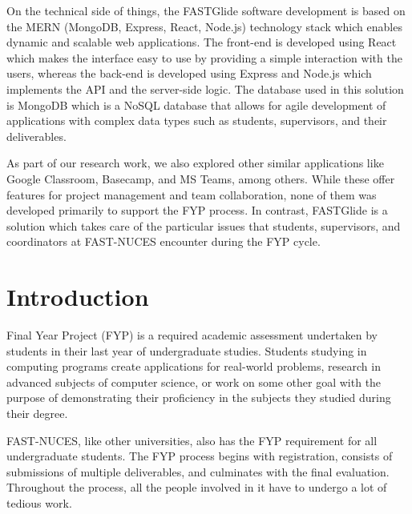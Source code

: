 \documentclass{FastFyp}
\begin{document}
On the technical side of things, the FASTGlide software development is based on the MERN (MongoDB, Express, React, Node.js) technology stack which enables dynamic and scalable web applications. The front-end is developed using React which makes the interface easy to use by providing a simple interaction with the users, whereas the back-end is developed using Express and Node.js which implements the API and the server-side logic. The database used in this solution is MongoDB which is a NoSQL database that allows for agile development of applications with complex data types such as students, supervisors, and their deliverables.

As part of our research work, we also explored other similar applications like Google Classroom, Basecamp, and MS Teams, among others. While these offer features for project management and team collaboration, none of them was developed primarily to support the FYP process. In contrast, FASTGlide is a solution which takes care of the particular issues that students, supervisors, and coordinators at FAST-NUCES encounter during the FYP cycle.
\pagebreak


\pagestyle{fancy} %
\tableofcontents

\pagebreak
\listoffigures	%
\pagebreak
\listoftables %

\mainmatter


\chapter{Introduction}
Final Year Project (FYP) is a required academic assessment undertaken by students in their
last year of undergraduate studies. Students studying in computing programs create
applications for real-world problems, research in advanced subjects of computer science, or
work on some other goal with the purpose of demonstrating their proficiency in the subjects
they studied during their degree.

FAST-NUCES, like other universities, also has the FYP requirement for all undergraduate
students. The FYP process begins with registration, consists of submissions of multiple
deliverables, and culminates with the final evaluation. Throughout the process, all the people
involved in it have to undergo a lot of tedious work.
\end{document}
